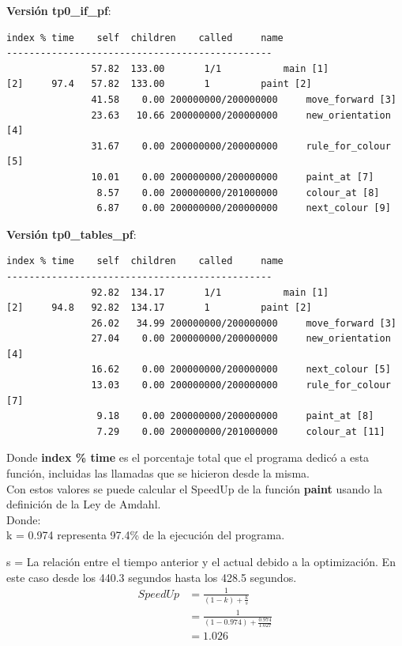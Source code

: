 \documentclass[a4paper, 10pt, twoside, notitlepage]{article}
\begin{document}
\textbf{Versión tp0\_if\_pf}:

\scriptsize
\begin{verbatim}
index % time    self  children    called     name
-----------------------------------------------
               57.82  133.00       1/1           main [1]
[2]     97.4   57.82  133.00       1         paint [2]
               41.58    0.00 200000000/200000000     move_forward [3]
               23.63   10.66 200000000/200000000     new_orientation [4]
               31.67    0.00 200000000/200000000     rule_for_colour [5]
               10.01    0.00 200000000/200000000     paint_at [7]
                8.57    0.00 200000000/201000000     colour_at [8]
                6.87    0.00 200000000/200000000     next_colour [9]
\end{verbatim}
\normalsize

\textbf{Versión tp0\_tables\_pf}:

\scriptsize
\begin{verbatim}
index % time    self  children    called     name
-----------------------------------------------
               92.82  134.17       1/1           main [1]
[2]     94.8   92.82  134.17       1         paint [2]
               26.02   34.99 200000000/200000000     move_forward [3]
               27.04    0.00 200000000/200000000     new_orientation [4]
               16.62    0.00 200000000/200000000     next_colour [5]
               13.03    0.00 200000000/200000000     rule_for_colour [7]
                9.18    0.00 200000000/200000000     paint_at [8]
                7.29    0.00 200000000/201000000     colour_at [11]
\end{verbatim}
\normalsize

Donde \textbf{index \% time} es el porcentaje total que el programa dedicó a esta función, incluidas las llamadas que se hicieron desde la misma.\\

Con estos valores se puede calcular el SpeedUp de la función \textbf{paint} usando la definición de la Ley de Amdahl.\\

Donde:\\

k = 0.974 representa 97.4\% de la ejecución del programa.

s = La relación entre el tiempo anterior y el actual debido a la optimización. En este caso desde los 440.3 segundos hasta los 428.5 segundos.
\begin{equation*} 
\begin{split}
 SpeedUp & =\frac{1}{(1-k) + \frac{k}{s}} \\
  &=\frac{1}{(1-0.974) + \frac{0.974}{1.027}} \\
  &= 1.026
\end{split}
\end{equation*}
\end{document}
